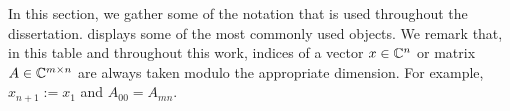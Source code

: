 In this section, we gather some of the notation that is used throughout the dissertation.   displays some of the most commonly used objects.  We remark that, in this table and throughout this work, indices of a vector $x \in \mathbb{C}^n$ or matrix $A \in \mathbb{C}^{m \times n}$ are always taken modulo the appropriate dimension.  For example, $x_{n + 1} := x_1$ and $A_{00} = A_{mn}$.

{\newcommand{\env}[1]{\texttt{#1}}\renewcommand{\thefootnote}{\fnsymbol{footnote}}
  \centering \renewcommand{\arraystretch}{1.5}
}

